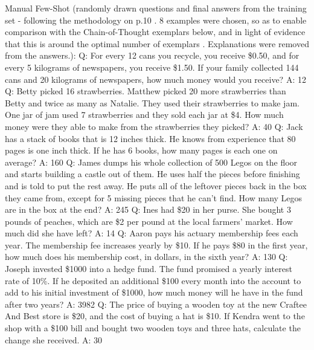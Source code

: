 \documentclass[11pt]{article}
\begin{document}
Manual Few-Shot (randomly drawn questions and final answers from the training set - following the methodology on p.10 \citealp{brown_language_2020}. 8 examples were chosen, so as to enable comparison with the Chain-of-Thought exemplars below, and in light of evidence that this is around the optimal number of exemplars \cite{min_rethinking_2022}. Explanations were removed from the answers.):
Q: For every 12 cans you recycle, you receive \$0.50, and for every 5 kilograms of newspapers, you receive \$1.50. If your family collected 144 cans and 20 kilograms of newspapers, how much money would you receive?
A: 12
Q: Betty picked 16 strawberries. Matthew picked 20 more strawberries than Betty and twice as many as Natalie. They used their strawberries to make jam. One jar of jam used 7 strawberries and they sold each jar at \$4. How much money were they able to make from the strawberries they picked?
A: 40
Q: Jack has a stack of books that is 12 inches thick. He knows from experience that 80 pages is one inch thick. If he has 6 books, how many pages is each one on average?
A: 160
Q: James dumps his whole collection of 500 Legos on the floor and starts building a castle out of them.  He uses half the pieces before finishing and is told to put the rest away.  He puts all of the leftover pieces back in the box they came from, except for 5 missing pieces that he can't find.  How many Legos are in the box at the end?
A: 245
Q: Ines had \$20 in her purse. She bought 3 pounds of peaches, which are \$2 per pound at the local farmers' market. How much did she have left?
A: 14
Q: Aaron pays his actuary membership fees each year. The membership fee increases yearly by \$10. If he pays \$80 in the first year, how much does his membership cost, in dollars, in the sixth year?
A: 130
Q: Joseph invested \$1000 into a hedge fund. The fund promised a yearly interest rate of 10\%. If he deposited an additional \$100 every month into the account to add to his initial investment of \$1000, how much money will he have in the fund after two years?
A: 3982
Q: The price of buying a wooden toy at the new Craftee And Best store is \$20, and the cost of buying a hat is \$10. If Kendra went to the shop with a \$100 bill and bought two wooden toys and three hats, calculate the change she received.
A: 30
\end{document}
